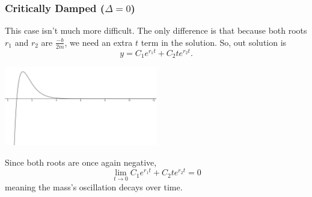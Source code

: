 \subsubsection{Critically Damped ($\Delta = 0$)}
This case isn't much more difficult.
The only difference is that because both roots $r_1$ and $r_2$ are $\frac{-b}{2m}$, we need an extra $t$ term in the solution. So, out solution is
\begin{equation*}
	y = C_1e^{r_1 t} + C_2te^{r_2 t}.
\end{equation*}
\begin{center}
	\includegraphics[width=0.5\textwidth]{./higherOrder/freeVibrs/criticallydamped.png}
\end{center}
Since both roots are once again negative,
\begin{equation*}
\lim\limits_{t \to 0}{C_1e^{r_1 t} + C_2te^{r_2 t}} = 0
\end{equation*}
meaning the mass's oscillation decays over time.